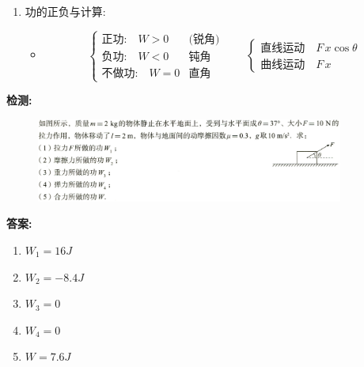 \documentclass{article}
\begin{document}
\begin{itemize}
\begin{enumerate}
\begin{enumerate}
                \item 功的正负与计算:
                \begin{itemize}
                    \item[]
                    $$
                    \begin{cases}
                        \text{正功:} \quad W > 0 & \text{(锐角)}  \\
                        \text{负功:} \quad W < 0 & \text{钝角}  \\
                        \text{不做功:} \quad W = 0 & \text{直角}  
                    \end{cases}
                    \hspace{2em}
                    \begin{cases}
                       \text{直线运动} \quad F\,x\cos{\theta}  \\
                        \text{曲线运动} \quad F\,x
                    \end{cases}
                    $$
                \end{itemize}

                

            \end{enumerate}

            

            
        \end{enumerate}

        \vspace{1em}

        \textbf{检测:} 
        \begin{figure}[h]
            \centering
            \includegraphics[width=0.9\textwidth]{pictures/1.png}
        \end{figure}
        
        \vspace{1em}

        \textbf{答案:} 
            \begin{enumerate}[label=(\arabic*)]
                \item $W_{1} = 16 J$
                \item $W_{2} = -8.4J$
                \item $W_{3} = 0$
                \item $W_{4} = 0$
                \item $W = 7.6J$
            \end{enumerate}


\end{itemize}
\end{document}
